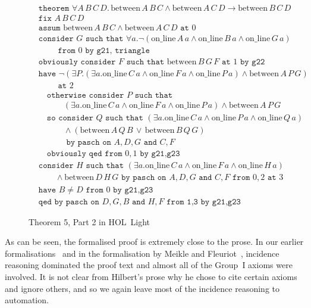 \documentclass{article}
\newcommand{\online}[2]{\text{on\_line}\,#1\,#2}
\newcommand{\between}[3]{\text{between}\,#1\,#2\,#3}
\newcommand{\Triangle}[4]{\forall #1.\neg(\online{#2}{a}\wedge \online{#3}{a}\wedge \online{#4}{a})}
\begin{document}
\begin{figure}
\begin{align*}
&\texttt{theorem }\forall A\,B\,C\,D.\,\between{A}{B}{C}\wedge \between{A}{C}{D}\rightarrow\between{B}{C}{D}\\
&\texttt{fix } A\,B\,C\,D\\
&\texttt{assum } \between{A}{B}{C}\wedge \between{A}{C}{D}\texttt{ at } 0\\
&\texttt{consider } G \texttt{ such that } \Triangle{a}{A}{B}{G}\\
&\qquad\texttt{ from } 0 \texttt{ by } \texttt{g21},\,\texttt{triangle}\\
&\texttt{obviously consider } F \texttt{ such that } \between{B}{G}{F} \texttt{ at } 1 \texttt{ by g22}\\
&\texttt{have } \neg(\exists P. (\exists a. \online{C}{a}\wedge \online{F}{a}\wedge \online{P}{a})\wedge \between{A}{P}{G})\\
&\qquad\texttt{ at } 2\\
&\quad\texttt{otherwise consider } P \texttt{ such that }\\
&\quad\qquad(\exists a. \online{C}{a}\wedge \online{F}{a}\wedge \online{P}{a})\wedge \between{A}{P}{G}\\
&\quad\texttt{so consider } Q \texttt{ such that } (\exists a. \online{C}{a}\wedge \online{P}{a}\wedge \online{Q}{a})\\
&\quad\qquad\wedge (\between{A}{Q}{B}\,\vee\,\between{B}{Q}{G})\\
&\quad\qquad\texttt{ by pasch on } A,D,G \texttt{ and } C,F\\
&\quad\texttt{obviously qed from } 0,1 \texttt{ by g21,g23}\\
&\texttt{consider } H \texttt{ such that } (\exists a. \online{C}{a}\wedge \online{F}{a}\wedge \online{H}{a})\\
&\qquad\wedge \between{D}{H}{G}\texttt{ by pasch on } A,D,G \texttt{ and } C,F \texttt{ from } 0,2 \texttt{ at } 3\\
&\texttt{have } B \neq D \texttt{ from } 0 \texttt{ by g21,g23}\\
&\texttt{qed by pasch on } D,G,B \texttt{ and } H,F \texttt{ from 1,3 by g21,g23}
\end{align*}
\caption{Theorem 5, Part 2 in HOL~Light}
\label{fig:Theorem52Formalised}
\end{figure}

As can be seen, the formalised proof is extremely close to the prose. In our earlier formalisations~\cite{ScottMScThesis} and in the formalisation by Meikle and Fleuriot~\cite{MeikleFleuriotFormalizingHilbert}, incidence reasoning dominated the proof text and almost all of the Group~I axioms were involved. It is not clear from Hilbert's prose why he chose to cite certain axioms and ignore others, and so we again leave most of the incidence reasoning to automation.
\end{document}
